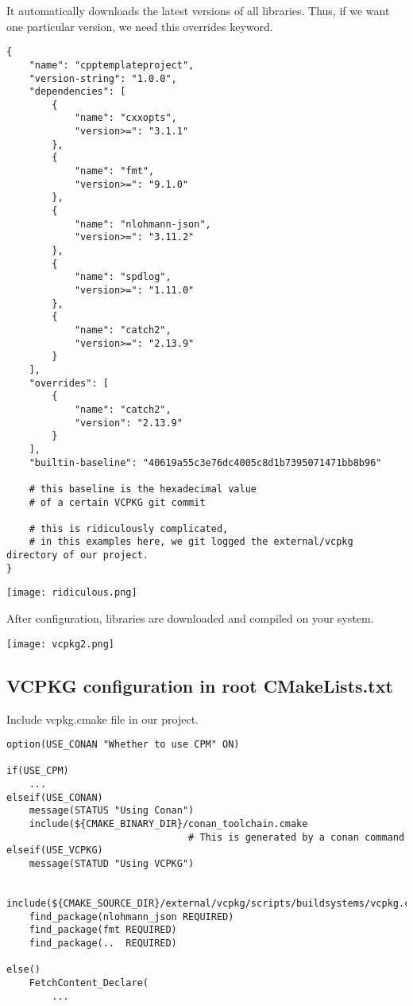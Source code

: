 \documentclass[openany]{report}
\begin{document}
It automatically downloads the latest versions of all libraries. Thus, if we want one particular
version, we need this overrides keyword.

\begin{verbatim}
{
    "name": "cpptemplateproject",
    "version-string": "1.0.0",
    "dependencies": [
        {
            "name": "cxxopts",
            "version>=": "3.1.1"
        },
        {
            "name": "fmt",
            "version>=": "9.1.0"
        },
        {
            "name": "nlohmann-json",
            "version>=": "3.11.2"
        },
        {
            "name": "spdlog",
            "version>=": "1.11.0"
        },
        {
            "name": "catch2",
            "version>=": "2.13.9"
        }
    ],
    "overrides": [
        {
            "name": "catch2",
            "version": "2.13.9"
        }
    ],
    "builtin-baseline": "40619a55c3e76dc4005c8d1b7395071471bb8b96"

    # this baseline is the hexadecimal value
    # of a certain VCPKG git commit

    # this is ridiculously complicated,
    # in this examples here, we git logged the external/vcpkg directory of our project.
}
\end{verbatim}


\begin{center}
    \texttt{[image: ridiculous.png]}
\end{center}


After configuration, libraries are downloaded and compiled on your system.


\begin{center}
    \texttt{[image: vcpkg2.png]}
\end{center}


\subsection{VCPKG configuration in root CMakeLists.txt}

Include vcpkg.cmake file in our project.

\begin{verbatim}
option(USE_CONAN "Whether to use CPM" ON)

if(USE_CPM)
    ...
elseif(USE_CONAN)
    message(STATUS "Using Conan")
    include(${CMAKE_BINARY_DIR}/conan_toolchain.cmake  
                                # This is generated by a conan command
elseif(USE_VCPKG)
    message(STATUD "Using VCPKG")

    include(${CMAKE_SOURCE_DIR}/external/vcpkg/scripts/buildsystems/vcpkg.cmake)
    find_package(nlohmann_json REQUIRED)
    find_package(fmt REQUIRED)
    find_package(..  REQUIRED)

else()
    FetchContent_Declare(
        ...
\end{verbatim}
\end{document}
